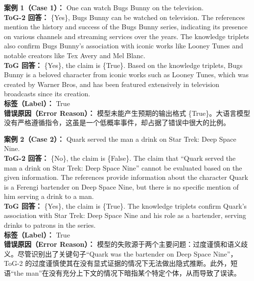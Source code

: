 \documentclass[11pt,UTF8,fontset=fandol]{ctexart}
\newcommand{\toctwo}{ToG-2}
\begin{document}
\noindent\textbf{案例 1（Case 1）：} One can watch Bugs Bunny on the television.\\
\textbf{\toctwo{} 回答：} \{Yes\}, Bugs Bunny can be watched on television. The references mention the history and success of the Bugs Bunny series, indicating its presence on various channels and streaming services over the years. The knowledge triplets also confirm Bugs Bunny's association with iconic works like Looney Tunes and notable creators like Tex Avery and Mel Blanc.\\
\textbf{ToG 回答：} \{Yes\}, the claim is \{True\}. Based on the knowledge triplets, Bugs Bunny is a beloved character from iconic works such as Looney Tunes, which was created by Warner Bros, and has been featured extensively in television broadcasts since its creation.\\
\textbf{标签（Label）：} True\\
\textbf{错误原因（Error Reason）：} 模型未能产生预期的输出格式 \{True\}。大语言模型没有严格遵循指令，这虽是一个低概率事件，却占据了错误中很大的比例。

\noindent\textbf{案例 2（Case 2）：} Quark served the man a drink on Star Trek: Deep Space Nine.\\
\textbf{\toctwo{} 回答：} \{No\}, the claim is \{False\}. The claim that ``Quark served the man a drink on Star Trek: Deep Space Nine'' cannot be evaluated based on the given information. The references provide information about the character Quark is a Ferengi bartender on Deep Space Nine, but there is no specific mention of him serving a drink to a man.\\
\textbf{ToG 回答：} \{Yes\}, the claim is \{True\}. The knowledge triplets confirm Quark's association with Star Trek: Deep Space Nine and his role as a bartender, serving drinks to patrons in the series.\\
\textbf{标签（Label）：} True\\
\textbf{错误原因（Error Reason）：} 模型的失败源于两个主要问题：过度谨慎和语义歧义。尽管识别出了关键句子“Quark was the bartender on Deep Space Nine”，\toctwo{} 的过度谨慎使其在没有显式证据的情况下无法做出隐式推断。此外，短语“the man”在没有充分上下文的情况下暗指某个特定个体，从而导致了误读。
\end{document}
